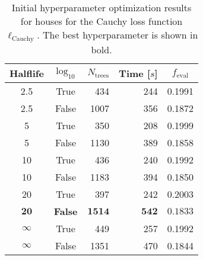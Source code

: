 \begin{table}[h!]
  \begin{tabular}{@{}ccrrc@{}}
    Halflife & $\log_{10}$ & $N_\mathrm{trees}$ & Time [$s$] & $f_\mathrm{eval}$ \\
    \midrule
    \num{2.5} & True & \num{434} & \num{244} & \num{0.1991} \\
    \num{2.5} & False & \num{1007} & \num{356} & \num{0.1872} \\
    \num{5} & True & \num{350} & \num{208} & \num{0.1999} \\
    \num{5} & False & \num{1130} & \num{389} & \num{0.1858} \\
    \num{10} & True & \num{436} & \num{240} & \num{0.1992} \\
    \num{10} & False & \num{1183} & \num{394} & \num{0.1850} \\
    \num{20} & True & \num{397} & \num{242} & \num{0.2003} \\
    $\mathbf{20}$ & \textbf{False} & $\mathbf{1514}$ & $\mathbf{542}$ & $\mathbf{0.1833}$ \\
    $\infty$ & True & \num{449} & \num{257} & \num{0.1992} \\
    $\infty$ & False & \num{1351} & \num{470} & \num{0.1844} \\
  \end{tabular}
  \caption[Initial Hyperparameter Optimization Results for Houses -- Cauchy Loss Function]{\label{tab:h:HPO_initial_Cauchy-villa-appendix}Initial hyperparameter optimization results for houses for the Cauchy loss function $\ell_\mathrm{Cauchy}$. The best hyperparameter is shown in bold.}
\end{table}


